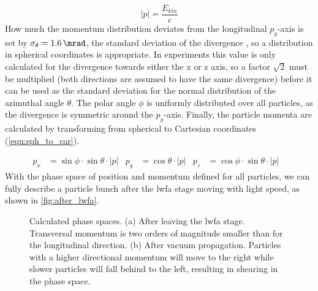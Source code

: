 \documentclass[bachelor_thesis]{subfiles}
\begin{document}
\begin{equation}
	\left|p\right|=\frac{E_{kin}}{c}
	\label{equ:E_to_mom}
\end{equation}
How much the momentum distribution deviates from the longitudinal $p_y$-axis is set by $\sigma_{\theta}=\qty{1.6}{\mrad}$, the standard deviation of the divergence , so a distribution in spherical coordinates is appropriate. 
In experiments this value is only calculated for the divergence towards either the x or z axis, so a factor $\sqrt{2}$ must be multiplied (both directions are assumed to have the same divergence) before 
it can be used as the standard deviation for the normal distribution of the azimuthal angle $\theta$. The polar angle $\phi$ is uniformly distributed over all particles, as the divergence is symmetric around the $p_y$-axis.
Finally, the particle momenta are calculated by transforming from spherical to Cartesian coordinates (\autoref{equ:sph_to_car}). 

\begin{align}
	p_x&=\sin{\phi} \cdot \sin{\theta} \cdot \left|p\right|	&
	p_y&=\cos{\theta} \cdot \left|p\right|				&
	p_z&=\cos{\phi} \cdot \sin{\theta} \cdot \left|p\right|	&
	\label{equ:sph_to_car}
\end{align}
With the phase space of position and momentum defined for all particles, we can fully describe a particle bunch after the \gls{lwfa} stage moving with light speed, as shown in \autoref{fig:after_lwfa}.

\begin{figure}
\begin{subfigure}{\textwidth}
	\missingfigure{}
	\label{fig:after_lwfa}
\end{subfigure}
\newline
\begin{subfigure}{\textwidth}
	\missingfigure{}
	\label{fig:after_vac}
\end{subfigure}
\caption{Calculated phase spaces. (a) After leaving the \gls{lwfa} stage. Transversal momentum is two orders of magnitude smaller than for the longitudinal direction. (b) After vacuum propagation. Particles with
a higher directional momentum will move to the right while slower particles will fall behind to the left, resulting in shearing in the phase space.}
\end{figure}
\end{document}
